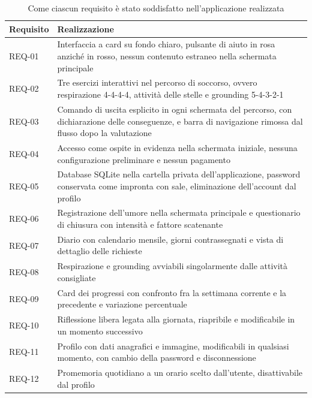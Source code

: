 \begin{table}[htbp]
    \centering
    \small
    \renewcommand{\arraystretch}{1.3}
    \begin{tabularx}{\textwidth}{L{2.1cm} X}
        \toprule
        \textbf{Requisito} & \textbf{Realizzazione} \\
        \midrule
        REQ-01 & Interfaccia a card su fondo chiaro, pulsante di aiuto in rosa anziché in rosso, nessun contenuto estraneo nella schermata principale \\
        REQ-02 & Tre esercizi interattivi nel percorso di soccorso, ovvero respirazione 4-4-4-4, attività delle stelle e grounding 5-4-3-2-1 \\
        REQ-03 & Comando di uscita esplicito in ogni schermata del percorso, con dichiarazione delle conseguenze, e barra di navigazione rimossa dal flusso dopo la valutazione \\
        REQ-04 & Accesso come ospite in evidenza nella schermata iniziale, nessuna configurazione preliminare e nessun pagamento \\
        REQ-05 & Database SQLite nella cartella privata dell'applicazione, password conservata come impronta con sale, eliminazione dell'account dal profilo \\
        REQ-06 & Registrazione dell'umore nella schermata principale e questionario di chiusura con intensità e fattore scatenante \\
        REQ-07 & Diario con calendario mensile, giorni contrassegnati e vista di dettaglio delle richieste \\
        REQ-08 & Respirazione e grounding avviabili singolarmente dalle attività consigliate \\
        REQ-09 & Card dei progressi con confronto fra la settimana corrente e la precedente e variazione percentuale \\
        REQ-10 & Riflessione libera legata alla giornata, riapribile e modificabile in un momento successivo \\
        REQ-11 & Profilo con dati anagrafici e immagine, modificabili in qualsiasi momento, con cambio della password e disconnessione \\
        REQ-12 & Promemoria quotidiano a un orario scelto dall'utente, disattivabile dal profilo \\
        \bottomrule
    \end{tabularx}
    \caption{Come ciascun requisito è stato soddisfatto nell'applicazione realizzata}
    \label{tab:requisiti}
\end{table}

